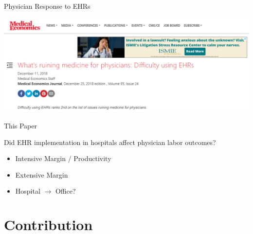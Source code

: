 \documentclass[10pt]{beamer}
\begin{document}
\begin{frame}[noframenumbering]{Physician Response to EHRs}
\begin{center}
    \includegraphics[scale=.35]{graphics/News Clip3.PNG}
\end{center}
\end{frame}

\begin{frame}{This Paper}

Did EHR implementation in hospitals affect physician labor outcomes?
\begin{itemize}
    \item Intensive Margin / Productivity
    \item Extensive Margin
    \item Hospital $\rightarrow$ Office?
\end{itemize}
\end{frame}


\section{Contribution}
\end{document}
